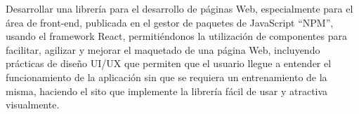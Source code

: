 Desarrollar una librería para el desarrollo de páginas Web, especialmente para el área de front-end, publicada en el gestor de paquetes de JavaScript “NPM”, usando el framework React, permitiéndonos la utilización de componentes para facilitar, agilizar y mejorar el maquetado de una página Web, incluyendo prácticas de diseño UI/UX que permiten que el usuario llegue a entender el funcionamiento de la aplicación sin que se requiera un entrenamiento de la misma, haciendo el sito que implemente la librería fácil de usar y atractiva visualmente. 
